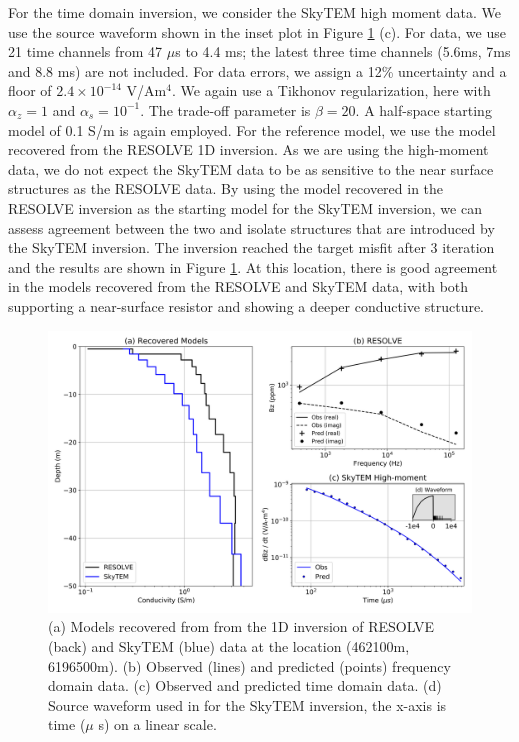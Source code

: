For the time domain inversion, we consider the SkyTEM high moment data. We use
the source waveform shown in the inset plot in Figure \ref{fig:booky1D} (c). For
data, we use 21 time channels from 47 $\mu$s to 4.4 ms; the latest three time
channels (5.6ms, 7ms and 8.8 ms) are not included. For data errors, we assign a
12\% uncertainty and a floor of $2.4\times 10^{-14}$ V/Am$^{4}$. We again use
a Tikhonov regularization, here with $\alpha_z = 1$ and $\alpha_s = 10^{-1}$.
The trade-off parameter is $\beta = 20$. A half-space starting model of 0.1
S/m is again employed. For the reference model, we use the model recovered
from the RESOLVE 1D inversion. As we are using the high-moment data, we do not
expect the SkyTEM data to be as sensitive to the near surface structures as
the RESOLVE data. By using the model recovered in the RESOLVE inversion as the
starting model for the SkyTEM inversion, we can assess agreement between the
two and isolate structures that are introduced by the SkyTEM inversion. The
inversion reached the target misfit after 3 iteration and the results are
shown in Figure \ref{fig:booky1D}. At this location, there is good agreement
in the models recovered from the RESOLVE and SkyTEM data, with both supporting
a near-surface resistor and showing a deeper conductive structure.



{%
\begin{figure}[htb!]
    \centering
    \includegraphics[width=\textwidth]{images/booky1D_time_freq.png}
\caption{
    (a) Models recovered from from the 1D inversion of RESOLVE (back) and SkyTEM
    (blue) data at the location (462100m, 6196500m). (b) Observed (lines) and
    predicted (points) frequency domain data. (c) Observed and predicted time
    domain data. (d) Source waveform used in for the SkyTEM inversion, the x-axis
    is time ($\mu$ s) on a linear scale.
}
\label{fig:booky1D}
\end{figure}
}

